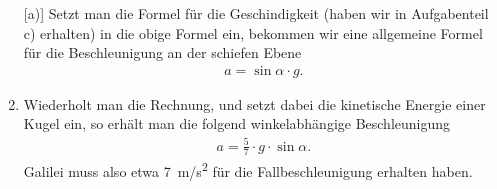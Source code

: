 \begin{aufgabe}
\begin{loesung}
\begin{enumerate} [a)]
	Setzt man die Formel für die Geschindigkeit (haben wir in Aufgabenteil c) erhalten) in die obige Formel ein, bekommen wir eine allgemeine
	Formel für die Beschleunigung an der schiefen Ebene
	\begin{eqnarray*}
		a=\sin\alpha\cdot g\text{.}
	\end{eqnarray*}

	\item Wiederholt man die Rechnung, und setzt dabei die kinetische Energie einer Kugel ein, so erhält man 
		die folgend winkelabhängige Beschleunigung
		\begin{eqnarray*}
			a=\frac{5}{7}\cdot g\cdot\sin\alpha\text{.}
		\end{eqnarray*}
		Galilei muss also etwa \SI{7}{m/s^2} für die Fallbeschleunigung erhalten haben.
		\end{enumerate}
	\end{loesung}

\end{aufgabe}


%
%

